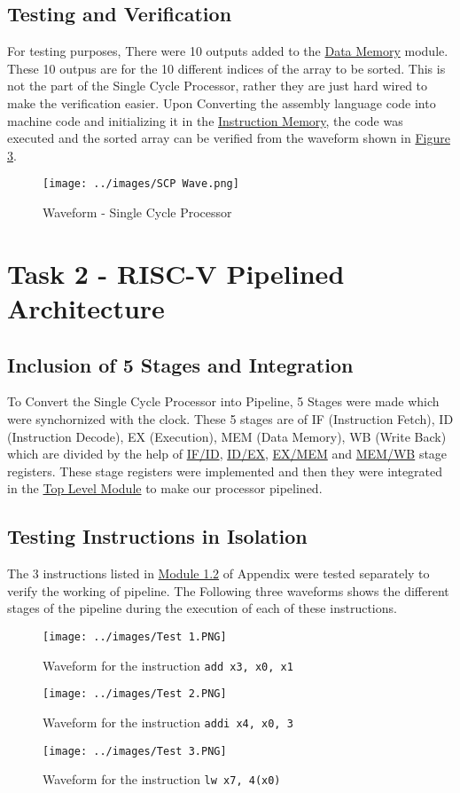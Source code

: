 \documentclass[12pt]{article}
\begin{document}
\subsection*{\Large Testing and Verification}
For testing purposes, There were 10 outputs added to the \hyperref[dmem]{Data Memory} module. These 10 outpus are for the 10 different indices of the array to be sorted. This is not the part of the Single Cycle Processor, rather they are just hard wired to make the verification easier. Upon Converting the assembly language code into machine code and initializing it in the \hyperref[imem]{Instruction Memory}, the code was executed and the sorted array can be verified from the waveform shown in \hyperref[img3]{Figure 3}.
\begin{figure}[H]
    \centering
    \texttt{[image: ../images/SCP Wave.png]}
    \label{img3}
    \caption{Waveform - Single Cycle Processor}
\end{figure}
\section*{\Huge Task 2 - RISC-V Pipelined Architecture}
\subsection*{\Large Inclusion of 5 Stages and Integration}
To Convert the Single Cycle Processor into Pipeline, 5 Stages were made which were synchornized with the clock. These 5 stages are of IF (Instruction Fetch), ID (Instruction Decode), EX (Execution), MEM (Data Memory), WB (Write Back)  which are divided by the help of \hyperref[if_id]{IF/ID}, \hyperref[id_ex]{ID/EX}, \hyperref[ex_mem]{EX/MEM} and \hyperref[mem_wb]{MEM/WB} stage registers. These stage registers were implemented and then they were integrated in the \hyperref[tlmp]{Top Level Module} to make our processor pipelined.
\subsection*{\Large Testing Instructions in Isolation}
The 3 instructions listed in \hyperref[iso]{Module 1.2} of Appendix were tested separately to verify the working of pipeline. The Following three waveforms shows the different stages of the pipeline during the execution of each of these instructions.
\begin{figure}[H]
    \centering
    \texttt{[image: ../images/Test 1.PNG]}
    \label{img4}
    \caption{Waveform for the instruction \texttt{add x3, x0, x1}}
\end{figure}
\begin{figure}[H]
    \centering
    \texttt{[image: ../images/Test 2.PNG]}
    \label{img5}
    \caption{Waveform for the instruction \texttt{addi x4, x0, 3}}
\end{figure}
\begin{figure}[H]
    \centering
    \texttt{[image: ../images/Test 3.PNG]}
    \label{img6}
    \caption{Waveform for the instruction \texttt{lw x7, 4(x0)}}
\end{figure}
\pagebreak
\end{document}
